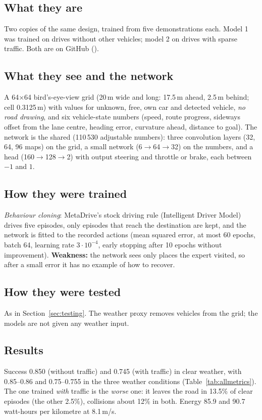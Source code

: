 \documentclass[11pt,a4paper]{article}
\begin{document}
\subsection{What they are}
Two copies of the same design, trained from five demonstrations each. Model 1 was trained on drives without other vehicles; model 2 on drives with sparse traffic. Both are on GitHub ().
\subsection{What they see and the network}
A 64$\times$64 bird's-eye-view grid (20\,m wide and long: 17.5\,m ahead, 2.5\,m behind; cell 0.3125\,m) with values for unknown, free, own car and detected vehicle, \emph{no road drawing}, and six vehicle-state numbers (speed, route progress, sideways offset from the lane centre, heading error, curvature ahead, distance to goal). The network is the shared  (110\,530 adjustable numbers): three convolution layers (32, 64, 96 maps) on the grid, a small network (6$\to$64$\to$32) on the numbers, and a head (160$\to$128$\to$2) with output steering and throttle or brake, each between $-1$ and $1$.
\subsection{How they were trained}
\emph{Behaviour cloning}: MetaDrive's stock driving rule (Intelligent Driver Model) drives five episodes, only episodes that reach the destination are kept, and the network is fitted to the recorded actions (mean squared error, at most 60 epochs, batch 64, learning rate $3\cdot10^{-4}$, early stopping after 10 epochs without improvement). \textbf{Weakness:} the network sees only places the expert visited, so after a small error it has no example of how to recover.
\subsection{How they were tested}
As in Section~\ref{sec:testing}. The weather proxy removes vehicles from the grid; the models are not given any weather input.
\subsection{Results}
Success 0.850 (without traffic) and 0.745 (with traffic) in clear weather, with 0.85--0.86 and 0.75--0.755 in the three weather conditions (Table~\ref{tab:allmetrics}). The one trained \emph{with} traffic is the \emph{worse} one: it leaves the road in 13.5\% of clear episodes (the other 2.5\%), collisions about 12\% in both. Energy 85.9 and 90.7 watt-hours per kilometre at 8.1\,m/s.
\end{document}

